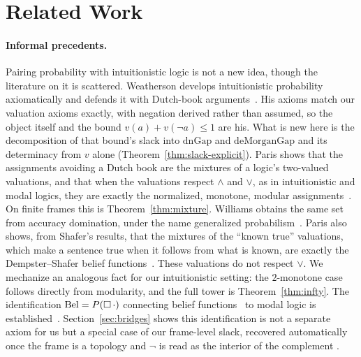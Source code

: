 \section{Related Work}
\label{sec:related}

\paragraph{Informal precedents.}
Pairing probability with intuitionistic logic is not a new idea,
though the literature on it is scattered.  Weatherson develops
intuitionistic probability axiomatically and defends it with
Dutch-book arguments~\cite{weatherson2003}.  His axioms match our
valuation axioms exactly, with
negation derived rather than assumed, so the object itself and the
bound $v(a) + v(\neg a) \le 1$ are his.  What is new here
is the decomposition of that bound's slack into $\mathrm{dnGap}$ and
$\mathrm{deMorganGap}$ and its determinacy from $v$ alone
(Theorem~\ref{thm:slack-explicit}).  
Paris shows that the assignments avoiding a Dutch book are the mixtures
of a logic's two-valued valuations, and that when the valuations respect
$\wedge$ and $\vee$, as in intuitionistic and modal logics, they are
exactly the normalized, monotone, modular
assignments~\cite{paris2001}. On finite frames this is
Theorem~\ref{thm:mixture}. Williams obtains the same set from accuracy
domination, under the name generalized probabilism~\cite{williams2012}.
Paris also shows, from Shafer's results, that the mixtures of the
``known true'' valuations, which make a sentence true when it follows
from what is known, are exactly the Dempster--Shafer belief
functions~\cite{paris1994,paris2001,shafer1976}. These valuations do not
respect $\vee$.  We mechanize an analogous fact for our
intuitionistic setting: the $2$-monotone case follows directly from
modularity, and the full tower is
Theorem~\ref{thm:infty}.  The
identification $\mathrm{Bel} = P(\Box\,\cdot)$ connecting belief
functions~\cite{dempster1967,shafer1976} to modal logic is
established~\cite{ruspini1986}.  Section~\ref{sec:bridges} shows this
identification is not a separate axiom for us but a special case of
our frame-level slack, recovered automatically once the frame is a
topology and $\neg$ is read as the interior of the complement
.  

